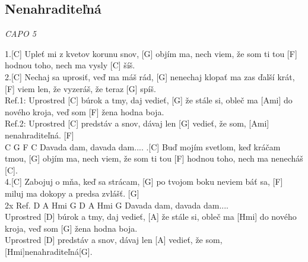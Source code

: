\documentclass[10pt]{article}
\begin{document}
\begin{Large}
\begin{minipage}{\textwidth}
\subsection{Nenahraditeľná}
\textit{CAPO 5}
\begin{multicols}{2}
\begin{guitar}
	1.[C] Upleť mi z kvetov korunu snov,
	[G] objím ma, nech viem, že som ti tou
	[F] hodnou toho,
	nech ma vysly [C] šíš.
	\\
	2.[C] Nechaj sa uprosiť, veď ma máš rád,
	[G] nenechaj klopať ma zas ďalší krát,
	[F] viem len, že vyzeráš,
	že teraz [G] spíš.
	\\
	Ref.1:
	Uprostred [C] búrok a tmy,
	daj vedieť, [G] že stále si,
	obleč ma [Ami] do nového kroja,
	veď som [F] žena hodna boja.
	\\
	Ref.2:
	Uprostred [C] predstáv a snov,
	dávaj len [G] vedieť, že som,
	[Ami] nenahraditeľná. [F]
	\\
	C G F C
	Davada dam, davada dam....
	.[C] Buď mojím svetlom, keď kráčam tmou,
	[G] objím ma, nech viem, že som ti tou
	[F] hodnou toho,
	nech ma nenecháš [C].
	\\
	4.[C] Zabojuj o mňa, keď sa strácam,
	[G] po tvojom boku neviem báť sa,
	[F] miluj ma dokopy a predsa zvlášť. [G]
	\\
	2x Ref. 
	D A Hmi G D A Hmi G
	Davada dam, davada dam....
	\\
	Uprostred [D] búrok a tmy,
	daj vedieť, [A] že stále si,
	obleč ma [Hmi] do nového kroja,
	veď som [G] žena hodna boja.
	\\
	Uprostred [D] predstáv a snov,
	dávaj len [A] vedieť, že som, 
	[Hmi]nenahraditeľná[G].
\end{guitar}
\end{multicols}
\end{minipage}

\begin{minipage}{\textwidth}

\end{minipage}
\end{Large}
\end{document}
